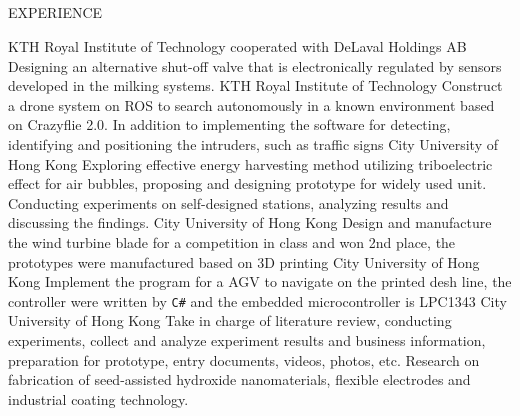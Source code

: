 \documentclass{my_cv}
\begin{document}
\begin{multicols}{2}
\section{\faPencil}{EXPERIENCE}

%
    {KTH Royal Institute of Technology cooperated with DeLaval Holdings AB}%
    {Designing an alternative shut-off valve that is electronically regulated by sensors developed in the milking systems.} %
%
    {KTH Royal Institute of Technology}%
    {Construct a drone system on ROS to search autonomously in a known environment based on Crazyflie 2.0. In addition to implementing the software for detecting, identifying and positioning the intruders, such as traffic signs}%
%
    {City University of Hong Kong}%
    {Exploring effective energy harvesting method utilizing triboelectric effect for air bubbles, proposing and designing prototype for widely used unit. Conducting experiments on self-designed stations, analyzing results and discussing the findings.}%
%
    {City University of Hong Kong}%
    {Design and manufacture the wind turbine blade for a competition in class and won 2nd place, the prototypes were manufactured based on 3D printing}%
%
    {City University of Hong Kong}%
    {Implement the program for a AGV to navigate on the printed desh line, the controller were written by \texttt{C\#} and the embedded microcontroller is LPC1343}%
%
    {City University of Hong Kong}%
    {Take in charge of literature review, conducting experiments, collect and analyze experiment results and business information, preparation for prototype, entry documents, videos, photos, etc. Research on fabrication of seed-assisted hydroxide nanomaterials, flexible electrodes and industrial coating technology.}%

\end{multicols}
\end{document}
